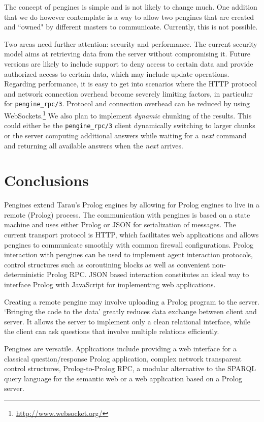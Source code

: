 \documentclass{new_tlp}
\newcommand{\reffont}{\tt}
\newcommand{\predref}[2]{\mbox{\reffont #1/#2}}
\begin{document}
The concept of pengines is simple and is not likely to change much. One
addition that we do however contemplate is a way to allow two
pengines that are created and ``owned" by different masters to
communicate. Currently, this is not possible.

Two areas need further attention: security and performance. The
current security model aims at retrieving data from the server without
compromising it. Future versions are likely to include support to deny
access to certain data and provide authorized access to certain data,
which may include update operations. Regarding performance, it is easy
to get into scenarios where the HTTP protocol and network connection
overhead become severely limiting factors, in particular for
\predref{pengine\_rpc}{3}. Protocol and connection overhead can be
reduced by using WebSockets.\footnote{\url{http://www.websocket.org/}}
We also plan to implement \emph{dynamic} chunking of the results. This
could either be the \predref{pengine\_rpc}{3} client dynamically
switching to larger chunks or the server computing additional answers
while waiting for a \textit{next} command and returning all available
answers when the \textit{next} arrives.


\section{Conclusions}

Pengines extend Tarau's Prolog
engines by allowing for Prolog engines to live in a remote (Prolog)
process. The communication with pengines is based on a state machine and
uses either Prolog or JSON for serialization of messages. The current
transport protocol is HTTP, which facilitates web applications and
allows pengines to communicate smoothly with common firewall
configurations. Prolog interaction with pengines can be used to
implement agent interaction protocols, control structures such as
coroutining blocks as well as convenient non-deterministic Prolog RPC.
JSON based interaction constitutes an ideal way to interface Prolog with
JavaScript for implementing web applications.

Creating a remote pengine may involve uploading a Prolog program to the
server. `Bringing the code to the data' greatly reduces data exchange
between client and server. It allows the server to implement only a
clean relational interface, while the client can ask questions that
involve multiple relations efficiently.

Pengines are versatile. Applications include providing a web interface
for a classical question/response Prolog application, complex network
transparent control structures, Prolog-to-Prolog RPC, a modular
alternative to the SPARQL query language for the semantic web or a web
application based on a Prolog server.
\end{document}
